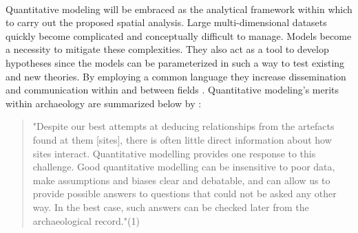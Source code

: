 \documentclass[12pt,a4paper]{thesis}
\begin{document}
\paragraph{}
Quantitative modeling will be embraced as the analytical framework within which to carry out the proposed spatial 
analysis. Large multi-dimensional datasets quickly become complicated and conceptually difficult to manage. Models become a necessity to mitigate these complexities. They also act as a tool to develop hypotheses since the models can be parameterized in such a way to test existing and new theories. By employing a common language they increase dissemination and communication within and between fields \citep{Wyl09}. Quantitative modeling's merits within archaeology are summarized below by \citep{ERK12}:

    
\begin{quote}
        "Despite our best attempts at deducing relationships from the artefacts found at them [sites], there is often little direct information about how sites interact. Quantitative modelling provides one response to this challenge. Good quantitative modelling can be insensitive to poor data, make assumptions and biases clear and debatable, and can allow us to provide possible answers to questions that could not be asked any other way. In the best case, such answers can be checked later from the archaeological record."(1)
\end{quote}
\end{document}
